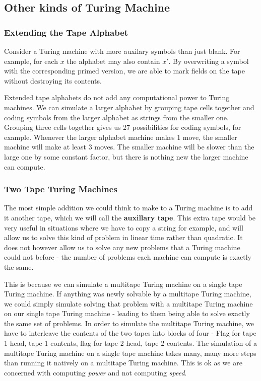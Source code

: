 \documentclass[11pt]{article}
\begin{document}
	\subsection{Other kinds of Turing Machine}
	\subsubsection{Extending the Tape Alphabet}
	Consider a Turing machine with more auxilary symbols than just blank. For example, for each $x$ the alphabet may also contain $x'$. By overwriting a symbol with the corresponding primed version, we are able to mark fields on the tape without destroying its contents.
	
	\par 
	Extended tape alphabets do not add any computational power to Turing machines. We can simulate a larger alphabet by grouping tape cells together and coding symbols from the larger alphabet as strings from the smaller one. Grouping three cells together gives us 27 possibilities for coding symbols, for example. Whenever the larger alphabet machine makes 1 move, the smaller machine will make at least 3 moves. The smaller machine will be slower than the large one by some constant factor, but there is nothing new the larger machine can compute.
	
	\subsubsection{Two Tape Turing Machines}
	The most simple addition we could think to make to a Turing machine is to add it another tape, which we will call the \textbf{auxillary tape}. This extra tape would be very useful in situations where we have to copy a string for example, and will allow us to solve this kind of problem in linear time rather than quadratic. It does not however allow us to solve any new problems that a Turing machine could not before - the number of problems each machine can compute is exactly the same.
	
	\par 
	This is because we can simulate a multitape Turing machine on a single tape Turing machine. If anything was newly solvable by a multitape Turing machine, we could simply simulate solving that problem with a multitape Turing machine on our single tape Turing machine - leading to them being able to solve exactly the same set of problems. In order to simulate the multitape Turing machine, we have to interleave the contents of the two tapes into blocks of four - Flag for tape 1 head, tape 1 contents, flag for tape 2 head, tape 2 contents. The simulation of a multitape Turing machine on a single tape machine takes many, many more steps than running it natively on a multitape Turing machine. This is ok as we are concerned with computing \textit{power} and not computing \textit{speed}.
	
\end{document}
